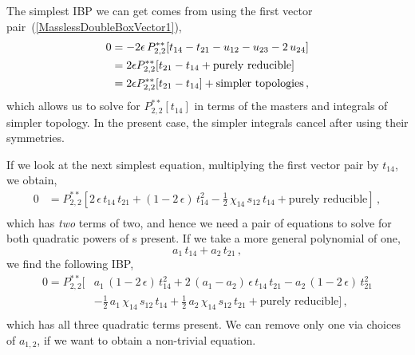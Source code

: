 \documentclass[aps,prd,preprint,groupedaddress,nofootinbib,showpacs,eqsecnum]{revtex4}
\def\eps{\epsilon}
\def\Pss#1#2{P^{**}_{#1,#2}}
\begin{document}
The simplest IBP we can get comes from using the 
first vector pair~(\ref{MasslessDoubleBoxVector1}),
\begin{equation}
\begin{aligned}
0 &= -2\e \,\Pss22[
t_{14}-t_{21}-u_{12}-u_{23}-2\,u_{24}
]\\
&=2\e \Pss22[t_{21}-t_{14}
+\textrm{purely\ reducible}]\\
&=2\e \Pss22[t_{21}-t_{14}]
+\textrm{simpler\ topologies}\,,
\end{aligned}
\label{BasicIrI}
\end{equation}
which allows us to solve for $\Pss22[t_{14}]$ in terms of the masters
and integrals of simpler topology.  In the present case, the simpler
integrals cancel after using their symmetries.

If we look at the next simplest equation, multiplying the first
vector pair by
$t_{14}$, we obtain,
\begin{equation}
\begin{aligned}
0 &= \Pss22[
2\,\eps\,t_{14}\,t_{21}
+(1-2\,\eps)\,t_{14}^{2}
-\tfrac{1}{2}\,\chi_{14}\,s_{12}\,t_{14}
+\textrm{purely\ reducible}]\,,\\
\end{aligned}
\label{BasicTimesA}
\end{equation}
which has {\it two\/} terms of \ideg{} two, and hence we need a pair of
equations to solve for both quadratic powers of \II{}s present.  If we take a
more general polynomial of \ideg{} one,
\begin{equation}
a_1 \,t_{14}+a_2 \,t_{21}\,,
\label{Polynomial1}
\end{equation}
we find the following IBP,
\begin{equation}
\begin{aligned}
0=\Pss22[&
a_{1}\,(1-2\,\eps)\,t_{14}^{2}
+2\,(a_{1}-a_{2})\,\eps\,t_{14}\,t_{21}-a_{2}\,(1-2\,\eps)\,t_{21}^{2}
\\ &
-\tfrac{1}{2}\,a_{1}\,\chi_{14}\,s_{12}\,t_{14}
+\tfrac{1}{2}\,a_{2}\,\chi_{14}\,s_{12}\,t_{21}
+\textrm{purely\ reducible}]\,,\\
\end{aligned}
\end{equation}
which has all three quadratic terms present.  We can remove only one
via choices of $a_{1,2}$, if we want to obtain a
non-trivial equation.
\end{document}
